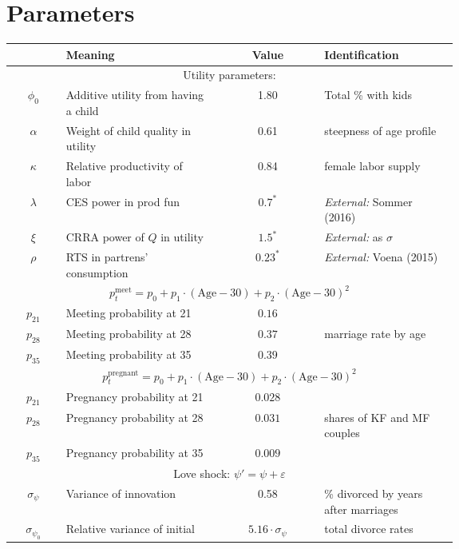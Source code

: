 \documentclass[12pt,letter]{article}
\begin{document}
\section{Parameters}
\begin{center}
\begin{tabular}{|c|p{0.35\linewidth}|c|p{0.3\linewidth}|}\hline
 & Meaning  & Value & Identification \\\hline
\multicolumn{4}{|c|}{Utility parameters:}\\\hline
$\phi_0$ & Additive utility from having a child & 1.80 & {\footnotesize Total \% with kids} \\
$\alpha$ & Weight of child quality in utility & 0.61 & {\footnotesize steepness of age profile } \\
$\kappa$ & Relative productivity of labor & 0.84 & {\footnotesize female labor supply} \\
$\lambda$ & CES power in prod fun &  $0.7^{*}$ & {\footnotesize \textit{External:} Sommer (2016) } \\
$\xi$ & CRRA power of $Q$ in utility &  $1.5^{*}$ & {\footnotesize \textit{External:} as $\sigma$} \\
$\rho$ & RTS in partrens' consumption & $0.23^{*}$ & {\footnotesize \textit{External:} Voena (2015) } \\\hline
\multicolumn{4}{|c|}{$p^{\text{meet}}_t = p_0 + p_1\cdot (\text{Age}-30) + p_2 \cdot (\text{Age}-30)^2$}\\\hline
$p_{21}$ & Meeting probability at 21 &  $0.16$ & \\
$p_{28}$ & Meeting probability at 28 &  $0.37$ & {\footnotesize marriage rate by age} \\
$p_{35}$ & Meeting probability at 35 &  $0.39$ &  \\\hline
\multicolumn{4}{|c|}{$p^{\text{pregnant}}_t = p_0 + p_1\cdot (\text{Age}-30) + p_2\cdot (\text{Age}-30)^2$ }\\\hline
$p_{21}$ & Pregnancy probability at 21 &  $0.028$ & \\
$p_{28}$ & Pregnancy probability at 28 &  $0.031$ &  {\footnotesize shares of KF and MF couples} \\
$p_{35}$ & Pregnancy probability at 35 &  $0.009$ & \\\hline
\multicolumn{4}{|c|}{Love shock: $\psi' = \psi + \varepsilon$}\\\hline
$\sigma_\psi$ & Variance of innovation &  0.58 & {\footnotesize \% divorced by years after marriages}   \\
$\sigma_{\psi_0}$ & Relative variance of initial & $5.16\cdot \sigma_\psi$ & {\footnotesize total divorce rates} \\\hline

\end{tabular}
\end{center}
\end{document}
